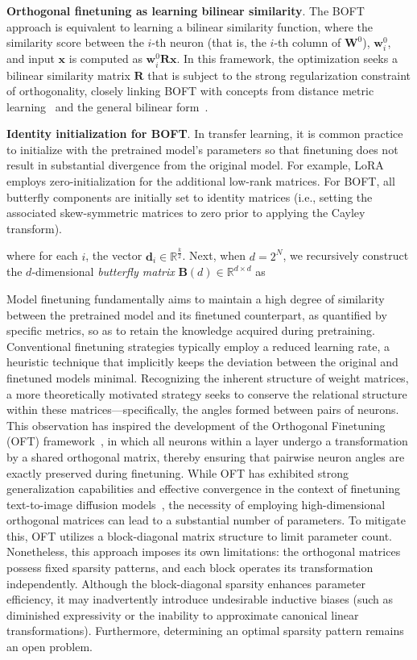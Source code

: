 \textbf{Orthogonal finetuning as learning bilinear similarity}. The BOFT approach is equivalent to learning a bilinear similarity function, where the similarity score between the $i$-th neuron (that is, the $i$-th column of $\bm{W}^0$), $\bm{w}^0_i$, and input $\bm{x}$ is computed as $\bm{w}^0_i\bm{R}\bm{x}$. In this framework, the optimization seeks a bilinear similarity matrix $\bm{R}$ that is subject to the strong regularization constraint of orthogonality, closely linking BOFT with concepts from distance metric learning~\cite{xing2002distance} and the general bilinear form~\cite{roman2005advanced}.

\textbf{Identity initialization for BOFT}. In transfer learning, it is common practice to initialize with the pretrained model’s parameters so that finetuning does not result in substantial divergence from the original model. For example, LoRA employs zero-initialization for the additional low-rank matrices. For BOFT, all butterfly components are initially set to identity matrices (i.e., setting the associated skew-symmetric matrices to zero prior to applying the Cayley transform).



where for each $i$, the vector $\bm{d}_i\in\mathbb{R}^{\frac{k}{2}}$. Next, when $d=2^N$, we recursively construct the $d$-dimensional \emph{butterfly matrix} $\bm{B}(d)\in\mathbb{R}^{d\times d}$ as

Model finetuning fundamentally aims to maintain a high degree of similarity between the pretrained model and its finetuned counterpart, as quantified by specific metrics, so as to retain the knowledge acquired during pretraining. Conventional finetuning strategies typically employ a reduced learning rate, a heuristic technique that implicitly keeps the deviation between the original and finetuned models minimal. Recognizing the inherent structure of weight matrices, a more theoretically motivated strategy seeks to conserve the relational structure within these matrices—specifically, the angles formed between pairs of neurons. This observation has inspired the development of the Orthogonal Finetuning (OFT) framework~\cite{qiu2023controlling}, in which all neurons within a layer undergo a transformation by a shared orthogonal matrix, thereby ensuring that pairwise neuron angles are exactly preserved during finetuning. While OFT has exhibited strong generalization capabilities and effective convergence in the context of finetuning text-to-image diffusion models~\cite{qiu2023controlling}, the necessity of employing high-dimensional orthogonal matrices can lead to a substantial number of parameters. To mitigate this, OFT utilizes a block-diagonal matrix structure to limit parameter count. Nonetheless, this approach imposes its own limitations: the orthogonal matrices possess fixed sparsity patterns, and each block operates its transformation independently. Although the block-diagonal sparsity enhances parameter efficiency, it may inadvertently introduce undesirable inductive biases (such as diminished expressivity or the inability to approximate canonical linear transformations). Furthermore, determining an optimal sparsity pattern remains an open problem.

